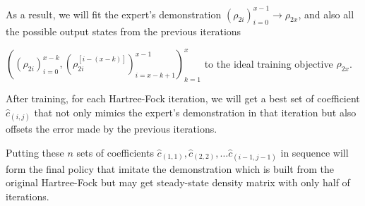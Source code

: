 \documentclass[twoside]{article}
\begin{document}
As a result, we will fit the expert's demonstration $(\rho_{2i})_{i=0}^{x-1} \rightarrow \rho_{2x}$, and also all the possible output states from the previous iterations 

$((\rho_{2i})_{i=0}^{x-k} ,(\rho_{2i}^{[i-(x-k)]})^{x-1}_{i=x-k+1})_{k=1}^{x}$  
to the ideal training objective $\rho_{2x}$.
%

After training, for each Hartree-Fock iteration, we will get a best set of coefficient $\hat{c}_{(i,j)}$ that not only mimics the expert's demonstration in that iteration but also offsets the error made by the previous iterations.

% 
Putting these $n$ sets of coefficients $\hat{c}_{(1,1)}, \hat{c}_{(2,2)}, \ldots  \hat{c}_{(i-1,j-1)}$ in sequence will form the final policy that imitate the demonstration which is built from  the original Hartree-Fock but may get steady-state density matrix with only half of iterations. 

\end{document}

